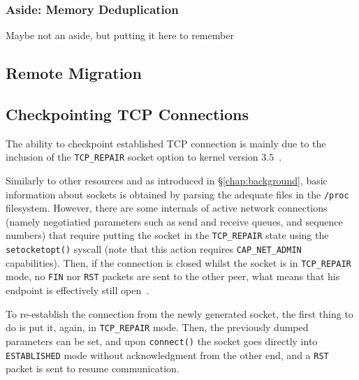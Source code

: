 \subsubsection*{Aside: Memory Deduplication}

Maybe not an aside, but putting it here to remember


\subsection{Remote Migration}

\subsection{Checkpointing TCP Connections}

The ability to checkpoint established TCP connection is mainly due to the inclusion of the \texttt{TCP\_REPAIR} socket option to kernel version $3.5$~\cite{tcp-connection-repair}.

Similarly to other resources and as introduced in \S\ref{chap:background}, basic information about sockets is obtained by parsing the adequate files in the \texttt{/proc} filesystem.
However, there are some internals of active network connections (namely negotiatied parameters such as send and receive queues, and sequence numbers) that require putting the socket in the \texttt{TCP\_REPAIR} state using the \texttt{setocketopt()} syscall (note that this action requires \texttt{CAP\_NET\_ADMIN} capabilities).
Then, if the connection is closed whilst the socket is in \texttt{TCP\_REPAIR} mode, no \texttt{FIN} nor \texttt{RST} packets are sent to the other peer, what means that his endpoint is effectively still open~\cite{Corbet12}.

To re-establish the connection from the newly generated socket, the first thing to do is put it, again, in \texttt{TCP\_REPAIR} mode.
Then, the previously dumped parameters can be set, and upon \texttt{connect()} the socket goes directly into \texttt{ESTABLISHED} mode without acknowledgment from the other end, and a \texttt{RST} packet is sent to resume communication.

